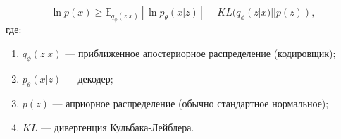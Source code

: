 \begin{equation}\label{eq:vae1}
    \ln p({x}) \geqslant \mathbb{E}_{q_\phi({z}|{x})}[\ln p_\theta({x}|{z})] - KL(q_\phi({z}|{x}) || p({z})),
\end{equation}
где:
\begin{enumerate}[label*=---]
	\item $q_\phi({z}|{x})$ --- приближенное апостериорное распределение (кодировщик);
	\item  $p_\theta({x}|{z})$ --- декодер;
	\item  $p({z})$ --- априорное распределение (обычно стандартное нормальное);
	\item  $KL$ --- дивергенция Кульбака-Лейблера.
\end{enumerate}






